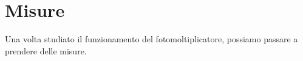 \pagebreak

\section{Misure}
Una volta studiato il funzionamento del fotomoltiplicatore, possiamo passare a prendere delle misure.\\
